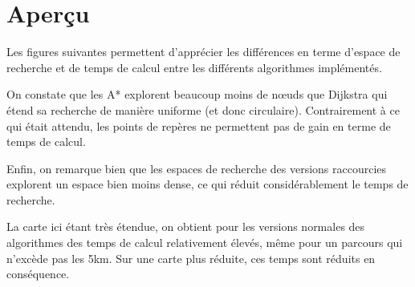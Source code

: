 \documentclass[a4paper, 11pt, DIV=12, numbers=enddot]{scrartcl}
\begin{document}
\section{Aperçu}
Les figures suivantes permettent d'apprécier les différences en terme d'espace de recherche et de temps de calcul entre les différents algorithmes implémentés.\newline

On constate que les A* explorent beaucoup moins de n\oe uds que Dijkstra qui étend sa recherche de manière uniforme (et donc circulaire). Contrairement à ce qui était attendu, les points de repères ne permettent pas de gain en terme de temps de calcul.

Enfin, on remarque bien que les espaces de recherche des versions \og raccourcies \fg{} explorent un espace bien moins dense, ce qui réduit considérablement le temps de recherche.\newline

La carte ici étant très étendue, on obtient pour les versions normales des algorithmes des temps de calcul relativement élevés, même pour un parcours qui n'excède pas les 5km. Sur une carte plus réduite, ces temps sont réduits en conséquence.
\end{document}

